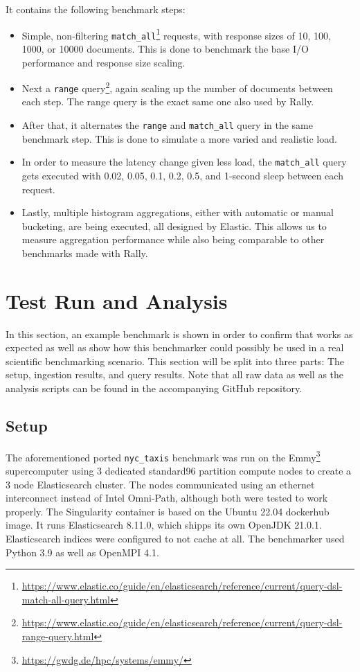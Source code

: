 It contains the following benchmark steps:
\begin{itemize}
  \item Simple, non-filtering \texttt{match\_all}\footnote{\url{https://www.elastic.co/guide/en/elasticsearch/reference/current/query-dsl-match-all-query.html}} requests, with response sizes of 10, 100, 1000, or 10000 documents. This is done to benchmark the base I/O performance and response size scaling.
  \item Next a \texttt{range} query\footnote{\url{https://www.elastic.co/guide/en/elasticsearch/reference/current/query-dsl-range-query.html}}, again scaling up the number of documents between each step. The range query is the exact same one also used by Rally.
  \item After that, it alternates the \texttt{range} and \texttt{match\_all} query in the same benchmark step. This is done to simulate a more varied and realistic load.
  \item In order to measure the latency change given less load, the \texttt{match\_all} query gets executed with 0.02, 0.05, 0.1, 0.2, 0.5, and 1-second sleep between each request.
  \item Lastly, multiple histogram aggregations, either with automatic or manual bucketing, are being executed, all designed by Elastic. This allows us to measure aggregation performance while also being comparable to other benchmarks made with Rally.
\end{itemize}

\section{Test Run and Analysis}
In this section, an example benchmark is shown in order to confirm that works as expected as well as show how this benchmarker could possibly be used in a real scientific benchmarking scenario. This section will be split into three parts: The setup, ingestion results, and query results. Note that all raw data as well as the analysis scripts can be found in the accompanying GitHub repository.

\subsection{Setup}
The aforementioned ported \texttt{nyc\_taxis} benchmark was run on the Emmy\footnote{\url{https://gwdg.de/hpc/systems/emmy/}} supercomputer using 3 dedicated standard96 partition compute nodes to create a 3 node Elasticsearch cluster. The nodes communicated using an ethernet interconnect instead of Intel Omni-Path, although both were tested to work properly. The Singularity container is based on the Ubuntu 22.04 dockerhub image. It runs Elasticsearch 8.11.0, which shipps its own OpenJDK 21.0.1. Elasticsearch indices were configured to not cache at all. The benchmarker used Python 3.9 as well as OpenMPI 4.1.

